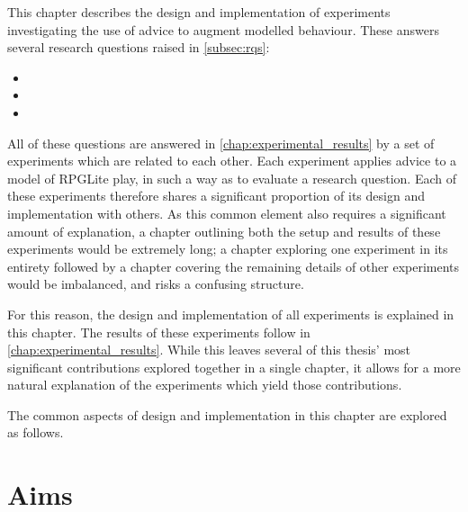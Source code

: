 This chapter describes the design and implementation of experiments
investigating the use of advice to augment modelled behaviour. These answers
several research questions raised in \cref{subsec:rqs}:

\begin{itemize}
  \item \rqtwo{}
  \item \rqthree{}
  \item \rqfour{}
\end{itemize}

All of these questions are answered in \cref{chap:experimental_results} by a set
of experiments which are related to each other. Each experiment applies advice
to a model of RPGLite play, in such a way as to evaluate a research question.
Each of these experiments therefore shares a significant proportion of its
design and implementation with others. As this common element also requires a
significant amount of explanation, a chapter outlining both the setup and
results of these experiments would be extremely long; a chapter exploring one
experiment in its entirety followed by a chapter covering the remaining details
of other experiments would be imbalanced, and risks a confusing structure.

For this reason, the design and implementation of all experiments is explained
in this chapter. The results of these experiments follow in
\cref{chap:experimental_results}. While this leaves several of this thesis' most
significant contributions explored together in a single chapter, it allows for a
more natural explanation of the experiments which yield those contributions.

The common aspects of design and implementation in this chapter are explored as
follows. 



\section{Aims}\label{sec:aop_simulation_optimisation_aims}

